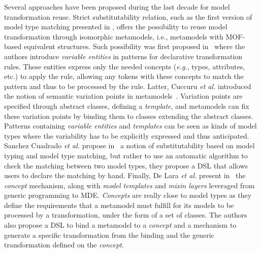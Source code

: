 Several approaches have been proposed during the last decade for model transformation reuse. Strict substitutability relation, such as the first version of model type matching presented in \cite{Steel07}, offers the possibility to reuse model transformation through isomorphic metamodels, i.e., metamodels with MOF-based equivalent structures. Such possibility was first proposed in~\cite{Varro04} where the authors introduce \emph{variable entities} in patterns for declarative transformation rules. These entities express only the needed concepts (\emph{e.g.}, types, attributes, etc.) to apply the rule, allowing any tokens with these concepts to match the pattern and thus to be processed by the rule. Latter, Cuccuru \emph{et al.} introduced the notion of semantic variation points in metamodels~\cite{Cuccuru07}. Variation points are specified through abstract classes, defining a \emph{template}, and metamodels can fix these variation points by binding them to classes extending the abstract classes. Patterns containing \emph{variable entities} and \emph{templates} can be seen as kinds of model types where the variability has to be explicitly expressed and thus anticipated.
%
Sanchez Cuadrado \emph{et al.} propose in~\cite{Sanchez08} a notion of substitutability based on model typing and model type matching, but rather to use an automatic algorithm to check the matching between two model types, they propose a DSL that allows users to declare the matching by hand.
%
Finally, De Lara \emph{et al.} present in~\cite{deLara10} the \emph{concept} mechanism, along with \emph{model templates} and \emph{mixin layers} leveraged from generic programming to MDE. \emph{Concepts} are really close to model types as they define the requirements that a metamodel must fulfill for its models to be processed by a transformation, under the form of a set of classes. The authors also propose a DSL to bind a metamodel to a \emph{concept} and a mechanism to generate a specific transformation from the binding and the generic transformation defined on the \emph{concept}.

